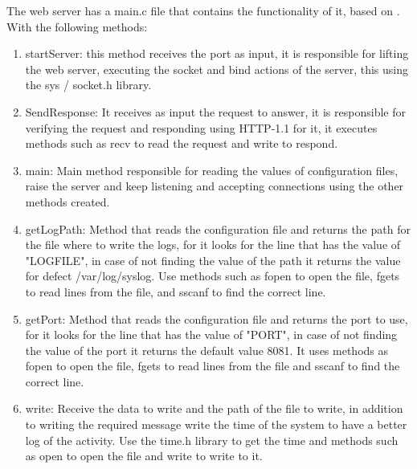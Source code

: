 \documentclass{article}
\begin{document}
The web server has a main.c file that contains the functionality of it, based on \cite{Server}.
With the following methods:
\begin{enumerate}
    \item startServer: this method receives the port as input, it is responsible for lifting the web server, executing the socket and bind actions of the server, this using the sys / socket.h library.
    \item SendResponse: It receives as input the request to answer, it is responsible for verifying the request and responding using HTTP-1.1 for it, it executes methods such as recv to read the request and write to respond.
    \item main: Main method responsible for reading the values of configuration files, raise the server and keep listening and accepting connections using the other methods created.
    \item getLogPath: Method that reads the configuration file and returns the path for the file where to write the logs, for it looks for the line that has the value of "LOGFILE", in case of not finding the value of the path it returns the value for defect /var/log/syslog. Use methods such as fopen to open the file, fgets to read lines from the file, and sscanf to find the correct line.
    \item getPort: Method that reads the configuration file and returns the port to use, for it looks for the line that has the value of "PORT", in case of not finding the value of the port it returns the default value 8081. It uses methods as fopen to open the file, fgets to read lines from the file and sscanf to find the correct line.
    \item write: Receive the data to write and the path of the file to write, in addition to writing the required message write the time of the system to have a better log of the activity. Use the time.h library to get the time and methods such as open to open the file and write to write to it.
\end{enumerate}
\end{document}
